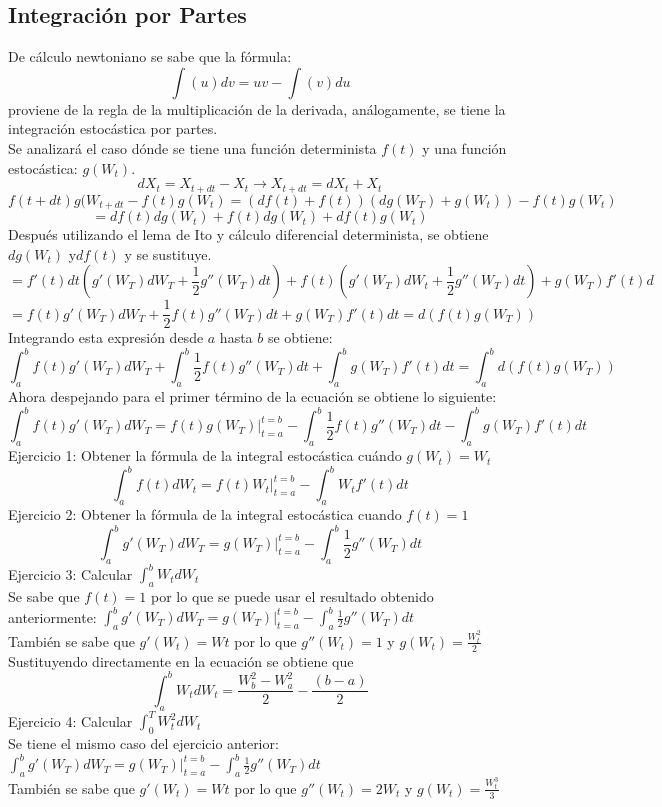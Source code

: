 \documentclass[11pt,fleqn]{book} %
\numberwithin{equation}{section} %
\numberwithin{figure}{section} %
\numberwithin{table}{section} %
\begin{document}
\subsection{Integración por Partes}
De cálculo newtoniano se sabe que la fórmula:
$$ \int (u) dv = uv - \int (v) du$$ 
proviene de la regla de la multiplicación de la derivada, análogamente, se tiene la integración estocástica por partes.
\ \\%
Se analizará el caso dónde se tiene una función determinista $f(t)$ y una función estocástica: $g(W_{t})$.
$$dX_t=X_{t+dt}-X_t \rightarrow X_{t+dt}=dX_t+X_t$$
$$f(t+dt)g(W_{t+dt}-f(t)g(W_t)=(df(t)+f(t))(dg(W_T)+g(W_t))-f(t)g(W_t)$$
$$=df(t)dg(W_t)+f(t)dg(W_t)+df(t)g(W_t)$$
Después utilizando el lema de Ito y cálculo diferencial determinista, se obtiene  $dg(W_t)$ y$ df(t)$ y se sustituye. 
$$=f'(t)dt(g'(W_T)dW_T+\frac{1}{2}g''(W_T)dt)+ f(t)(g'(W_T)dW_t+\frac{1}{2}g''(W_T)dt)+g(W_T)f'(t)d$$
$$
=f(t)g'(W_T)dW_T+\frac{1}{2}f(t)g''(W_T)dt+g(W_T)f'(t)dt=d(f(t)g(W_T))
$$
Integrando esta expresión desde $a$ hasta $b$ se obtiene: 
$$ \int^{b}_{a} f(t)g'(W_T)dW_T+\int^{b}_{a}\frac{1}{2}f(t)g''(W_T)dt+\int^{b}_{a} g(W_T)f'(t)dt=\int^{b}_{a} d(f(t)g(W_T))$$
Ahora despejando para el primer término de la ecuación se obtiene lo siguiente:
$$\int^{b}_{a} f(t)g'(W_T)dW_T= f(t)g(W_T)|^{t=b}_{t=a}-\int^{b}_{a} \frac{1}{2}f(t)g''(W_T)dt-\int^{b}_{a} g(W_T)f'(t)dt$$
Ejercicio 1: Obtener la fórmula de la integral estocástica cuándo $g(W_{t})=W_{t}$
$$ \int^{b}_{a} f(t)dW_{t}= f(t)W_{t}|^{t=b}_{t=a}-\int^{b}_{a} W_{t}f'(t)dt$$
Ejercicio 2: Obtener la fórmula de la integral estocástica cuando $f(t)=1$
$$\int^{b}_{a}g'(W_T)dW_T= g(W_T)|^{t=b}_{t=a}-\int^{b}_{a} \frac{1}{2}g''(W_T)dt$$
Ejercicio 3: Calcular $\int^{b}_{a}W_t dW_t$
\ \\%
Se sabe que $f(t)=1$ por lo que se puede usar el resultado obtenido anteriormente: 
$\int^{b}_{a}g'(W_T)dW_T= g(W_T)|^{t=b}_{t=a}-\int^{b}_{a} \frac{1}{2}g''(W_T)dt$
\ \\%
También se sabe que $g'(W_t)=Wt$ por lo que
$g''(W_t)=1$ y $g(W_t)=\frac{W_t^2}{2}$
Sustituyendo directamente en la ecuación se obtiene que
$$\int^{b}_{a}W_t dW_t=\frac{W_b^2-W_a^2}{2}-\frac{(b-a)}{2}$$
Ejercicio 4: Calcular $\int^{T}_{0}W_t^2 dW_t$
\ \\%
Se tiene el mismo caso del ejercicio anterior:
$\int^{b}_{a}g'(W_T)dW_T= g(W_T)|^{t=b}_{t=a}-\int^{b}_{a} \frac{1}{2}g''(W_T)dt$
\ \\%
También se sabe que $g'(W_t)=Wt$ por lo que
$g''(W_t)=2W_t$ y $g(W_t)=\frac{W_t^3}{3}$
\end{document}
